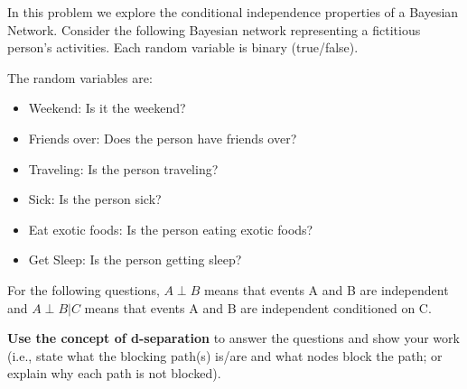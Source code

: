 \documentclass[submit]{harvardml}
\newcommand{\attr}[1]{\textsf{#1}}
\begin{document}
\begin{problem}

  \noindent In this problem we explore the conditional independence
  properties of a Bayesian Network.  Consider the following Bayesian
  network representing a fictitious person's activities. Each random
  variable is binary (true/false).

\begin{center}
  \end{center}

  The random variables are:

  \begin{itemize}
  \item \attr{Weekend}: Is it the weekend?
  \item \attr{Friends over}: Does the person have friends over?
  \item \attr{Traveling}: Is the person traveling?
  \item \attr{Sick}: Is the person sick?
  \item \attr{Eat exotic foods}: Is the person eating exotic foods?
  \item \attr{Get Sleep}: Is the person getting sleep?
  \end{itemize}

  \medskip

  For the following questions, $A \perp B$ means that events A and B are
  independent and $A \perp B | C$ means that events A and B are independent
  conditioned on C.

  \textbf{Use the concept of d-separation} to answer the
  questions and show your work (i.e., state what the blocking path(s) is/are and what nodes block the path; or explain why each path is not blocked).


\end{problem}
\end{document}
